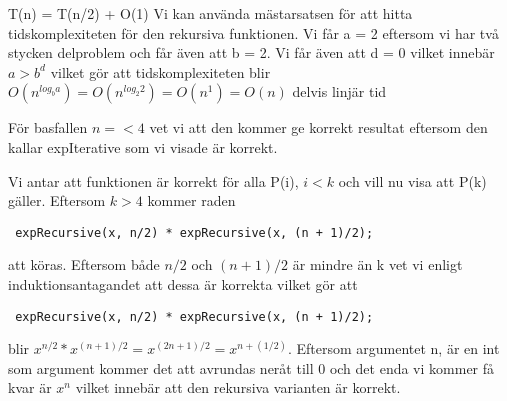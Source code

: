 \documentclass{article}
\begin{document}
T(n) = T(n/2) + O(1)
Vi kan använda mästarsatsen för att hitta tidskomplexiteten för den rekursiva funktionen. Vi får a = 2 eftersom vi har två stycken delproblem och får även att b = 2. Vi får även att d = 0 vilket innebär $a > b^d$ vilket gör att tidskomplexiteten blir $O(n^{log_b a}) = O(n^{log_2 2}) = O(n^1) = O(n)$ delvis linjär tid

För basfallen $n =< 4$ vet vi att den kommer ge korrekt resultat eftersom den kallar expIterative som vi visade är korrekt. 

Vi antar att funktionen är korrekt för alla P(i), $i < k$ och vill nu visa att P(k) gäller. Eftersom $k > 4$ kommer raden 
\begin{lstlisting}
 expRecursive(x, n/2) * expRecursive(x, (n + 1)/2);   
\end{lstlisting}
 att köras. Eftersom både $n/2$ och $(n + 1) / 2$ är mindre än k vet vi enligt induktionsantagandet att dessa är korrekta vilket gör att \begin{lstlisting}
 expRecursive(x, n/2) * expRecursive(x, (n + 1)/2);   
\end{lstlisting} blir $x^{n/2} * x ^{(n+1)/2} = x^{(2n+1)/2} = x^{n + (1/2)}$. Eftersom argumentet n, är en int som argument kommer det att avrundas neråt till 0 och det enda vi kommer få kvar är $x^n$ vilket innebär att den rekursiva varianten är korrekt. 
\end{document}
